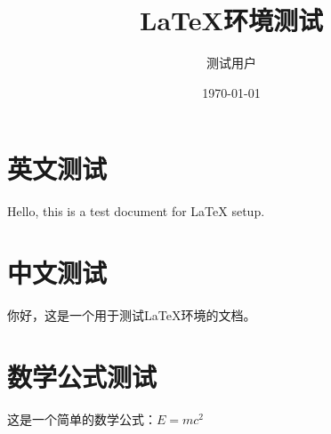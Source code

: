 \documentclass{article}
\title{LaTeX环境测试}
\author{测试用户}
\date{\today}
\begin{document}
\maketitle

\section{英文测试}
Hello, this is a test document for LaTeX setup.

\section{中文测试}
你好，这是一个用于测试LaTeX环境的文档。

\section{数学公式测试}
这是一个简单的数学公式：$E = mc^2$
\end{document}
